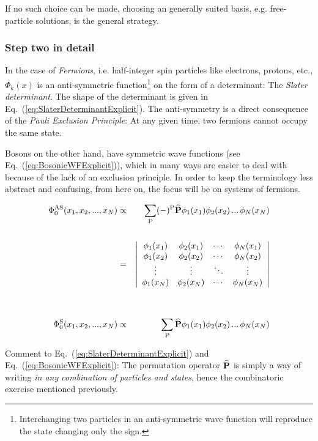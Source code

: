 If no such choice can be made, choosing an generally suited basis, e.g. free-particle solutions, is the general strategy. 


\subsubsection{Step two in detail}

In the case of \textit{Fermions}, i.e. half-integer spin particles like electrons, protons, etc., $\Phi_k(x)$ is an anti-symmetric function\footnote{Interchanging two particles in an anti-symmetric wave function will reproduce the state changing only the sign.} on the form of a determinant: The \textit{Slater determinant}. The shape of the determinant is given in Eq.~(\ref{eq:SlaterDeterminantExplicit}). The anti-symmetry is a direct consequence of the \textit{Pauli Exclusion Principle}: At any given time, two fermions cannot occupy the same state. 

Bosons on the other hand, have symmetric wave functions (see Eq.~(\ref{eq:BosonicWFExplicit})), which in many ways are easier to deal with because of the lack of an exclusion principle. In order to keep the terminology less abstract and confusing, from here on, the focus will be on systems of fermions.

\begin{eqnarray}
\label{eq:SlaterDeterminantExplicit}
\Phi_0^\mathrm{AS}(x_1, x_2, ..., x_N) &\propto& \sum_\mathrm{P} (-)^\mathrm{P} {\bf\widehat{P}}\phi_1(x_1)\phi_2(x_2)\,...\,\phi_N(x_N) \nonumber\\
\nonumber\\
&=&\left| \begin{array}{cccc}
\phi_1(x_1) & \phi_2(x_1)& \cdots & \phi_N(x_1) \\
\phi_1(x_2) & \phi_2(x_2)& \cdots & \phi_N(x_2) \\
\vdots & \vdots& \ddots & \vdots \\
\phi_1(x_N) & \phi_2(x_N)& \cdots & \phi_N(x_N) \\
 \end{array} \right| \\
\nonumber\\
\nonumber\\
 \label{eq:BosonicWFExplicit}
 \Phi_0^\mathrm{S}(x_1, x_2, ..., x_N) &\propto& \sum_\mathrm{P} {\bf\widehat{P}}\phi_1(x_1)\phi_2(x_2)\,...\,\phi_N(x_N)
\end{eqnarray}

Comment to Eq.~(\ref{eq:SlaterDeterminantExplicit}) and Eq.~(\ref{eq:BosonicWFExplicit}): The permutation operator ${\bf\widehat{P}}$ is simply a way of writing \textit{in any combination of particles and states}, hence the combinatoric exercise mentioned previously.

